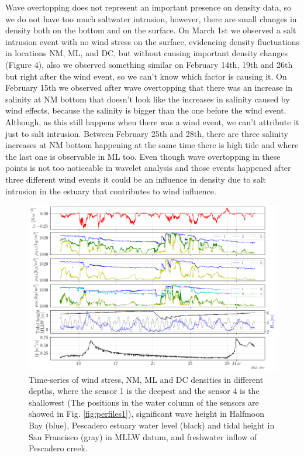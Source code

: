 \documentclass[11pt,letterpaper]{article}
\begin{document}
Wave overtopping does not represent an important presence on density data, so we do not have too much saltwater intrusion, however, there are small changes in density both on the bottom and on the surface. On March 1st we observed a salt intrusion event with no wind stress on the surface, evidencing density fluctuations in locations NM, ML, and DC, but without causing important density changes (Figure 4), also we observed something similar on February 14th, 19th and 26th but right after the wind event, so we can't know which factor is causing it. On February 15th we observed after wave overtopping that there was an increase in salinity at NM bottom that doesn't look like the increases in salinity caused by wind effects, because the salinity is bigger than the one before the wind event. Although, as this still happens when there was a wind event, we can't attribute it just to salt intrusion. Between February 25th and 28th, there are three salinity increases at NM bottom happening at the same time there is high tide and where the last one is observable in ML too. Even though wave overtopping in these points is not too noticeable in wavelet analysis and those events happened after three different wind events it could be an influence in density due to salt intrusion in the estuary that contributes to wind influence. 


\begin{figure}[h!]
    \centering
    \includegraphics[width=\textwidth]{Imagenes/dens.png}
    \caption{Time-series of wind stress, NM, ML and DC densities in different depths, where the sensor 1 is the deepest and the sensor 4 is the shallowest (The positions in the water column of the sensors are showed in Fig. \ref{fig:perfiles1}), significant wave height in Halfmoon Bay (blue), Pescadero estuary water level (black) and tidal height in San Francisco (gray) in MLLW datum, and freshwater inflow of Pescadero creek.}
    \label{fig:dens}
\end{figure}
\end{document}
